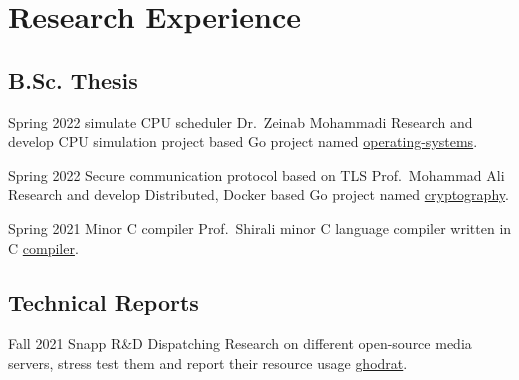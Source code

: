 \section{Research Experience}

\subsection{B.Sc. Thesis}

\cventry%
  {Spring 2022}
  {simulate CPU scheduler}
  {}
  {Dr.\ Zeinab Mohammadi}
  {}{%
    Research and develop CPU simulation project based Go project named \href{https://github.com/mohammadne/university}{operating-systems}.
  }

\cventry%
  {Spring 2022}
  {Secure communication protocol based on TLS}
  {}
  {Prof.\ Mohammad Ali}
  {}{%
    Research and develop Distributed, Docker based Go project named \href{https://github.com/mohammadne/university}{cryptography}.
  }

\cventry%
  {Spring 2021}
  {Minor C compiler}
  {}
  {Prof.\ Shirali}
  {}{%
    minor C language compiler written in C \href{https://github.com/mohammadne/university}{compiler}.
  }

\subsection{Technical Reports}

\cventry%
  {Fall 2021}
  {Snapp R\&D}
  {}
  {Dispatching}
  {}{%
    Research on different open-source media servers, stress test them and report their resource usage \href{https://github.com/snapp-incubator/ghodrat}{ghodrat}.
  }
